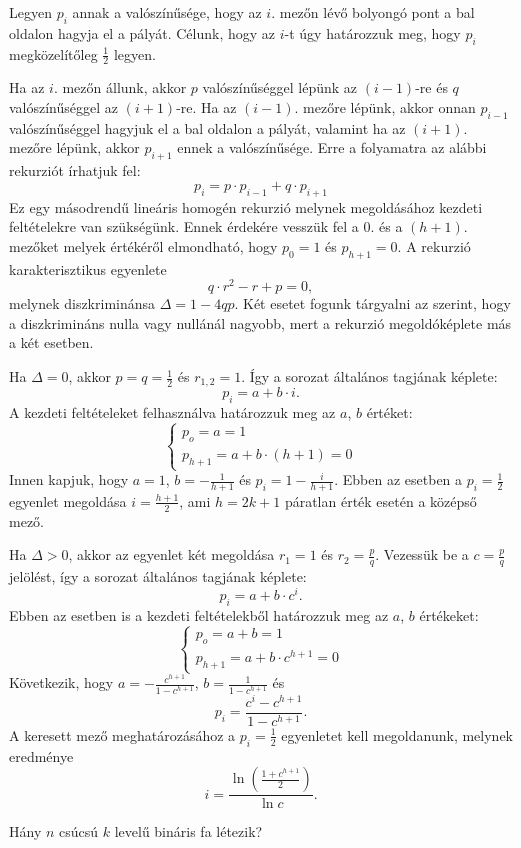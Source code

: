 \begin{solution}
Legyen $p_{i}$ annak a valószínűsége, hogy az $i.$ mezőn lévő bolyongó
pont a bal oldalon hagyja el a pályát. Célunk, hogy az $i$-t úgy
határozzuk meg, hogy $p_{i}$ megközelítőleg $\frac{1}{2}$ legyen.

Ha az $i.$ mezőn állunk, akkor $p$ valószínűséggel lépünk az $(i-1)$-re
és $q$ valószínűséggel az $(i+1)$-re. Ha az $(i-1).$ mezőre lépünk,
akkor onnan $p_{i-1}$ valószínűséggel hagyjuk el a bal oldalon a
pályát, valamint ha az $(i+1).$ mezőre lépünk, akkor $p_{i+1}$ ennek
a valószínűsége. Erre a folyamatra az alábbi rekurziót írhatjuk fel:
\[
p_{i}=p\cdot p_{i-1}+q\cdot p_{i+1}
\]
Ez egy másodrendű lineáris homogén rekurzió melynek megoldásához kezdeti
feltételekre van szükségünk. Ennek érdekére vesszük fel a 0. és a
$(h+1).$ mezőket melyek értékéről elmondható, hogy $p_{0}=1$ és
$p_{h+1}=0$. A rekurzió karakterisztikus egyenlete 
\[
q\cdot r^{2}-r+p=0,
\]
melynek diszkriminánsa $\Delta=1-4qp$. Két esetet fogunk tárgyalni
az szerint, hogy a diszkrimináns nulla vagy nullánál nagyobb, mert
a rekurzió megoldóképlete más a két esetben.

Ha $\Delta=0$, akkor $p=q=\frac{1}{2}$ és $r_{1,2}=1$. Így a sorozat
általános tagjának képlete: 
\[
p_{i}=a+b\cdot i.
\]
A kezdeti feltételeket felhasználva határozzuk meg az $a$, $b$ értéket:
\[
\left\{ \begin{array}{l}
p_{o}=a=1\\
p_{h+1}=a+b\cdot(h+1)=0
\end{array}\right.
\]
Innen kapjuk, hogy $a=1$, $b=-\frac{1}{h+1}$ és $p_{i}=1-\frac{i}{h+1}$.
Ebben az esetben a $p_{i}=\frac{1}{2}$ egyenlet megoldása $i=\frac{h+1}{2}$,
ami $h=2k+1$ páratlan érték esetén a középső mező.

Ha $\Delta>0$, akkor az egyenlet két megoldása $r_{1}=1$ és $r_{2}=\frac{p}{q}$.
Vezessük be a $c=\frac{p}{q}$ jelölést, így a sorozat általános tagjának
képlete: 
\[
p_{i}=a+b\cdot c^{i}.
\]
Ebben az esetben is a kezdeti feltételekből határozzuk meg az $a$,
$b$ értékeket: 
\[
\left\{ \begin{array}{l}
p_{o}=a+b=1\\
p_{h+1}=a+b\cdot c^{h+1}=0
\end{array}\right.
\]
Következik, hogy $a=-\frac{c^{h+1}}{1-c^{h+1}}$, $b=\frac{1}{1-c^{h+1}}$
és 
\[
p_{i}=\frac{c^{i}-c^{h+1}}{1-c^{h+1}}.
\]
A keresett mező meghatározásához a $p_{i}=\frac{1}{2}$ egyenletet
kell megoldanunk, melynek eredménye 
\[
i=\frac{\ln\left(\frac{1+c^{h+1}}{2}\right)}{\ln c}.
\]
\end{solution}
\begin{extraproblem}
Hány $n$ csúcsú $k$ levelű bináris fa létezik? 
\end{extraproblem}

